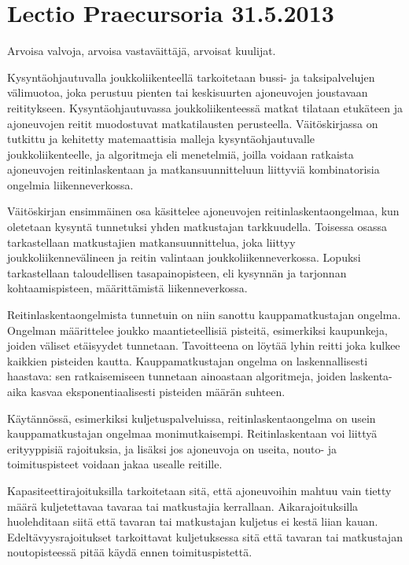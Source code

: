 \documentclass[a4paper,12pt]{article}
\begin{document}
\section*{Lectio Praecursoria 31.5.2013}
Arvoisa valvoja, arvoisa vastaväittäjä, arvoisat kuulijat.

Kysyntäohjautuvalla joukkoliikenteellä tarkoitetaan bussi- ja taksipalvelujen välimuotoa, joka perustuu pienten tai 
keskisuurten ajoneuvojen joustavaan reititykseen. Kysyntäohjautuvassa joukkoliikenteessä matkat tilataan etukäteen ja
ajoneuvojen reitit muodostuvat matkatilausten perusteella.
Väitöskirjassa on tutkittu ja kehitetty matemaattisia malleja kysyntäohjautuvalle joukkoliikenteelle, ja algoritmeja eli menetelmiä,
joilla voidaan ratkaista ajoneuvojen reitinlaskentaan ja matkansuunnitteluun liittyviä kombinatorisia ongelmia liikenneverkossa.

Väitöskirjan ensimmäinen osa käsittelee ajoneuvojen reitinlaskentaongelmaa, kun oletetaan kysyntä tunnetuksi yhden matkustajan tarkkuudella. 
Toisessa osassa tarkastellaan matkustajien matkansuunnittelua, joka liittyy joukkoliikennevälineen ja reitin valintaan joukkoliikenneverkossa.
Lopuksi tarkastellaan taloudellisen tasapainopisteen, eli kysynnän ja tarjonnan kohtaamispisteen, määrittämistä liikenneverkossa.

Reitinlaskentaongelmista tunnetuin on niin sanottu kauppamatkustajan ongelma. Ongelman määrittelee joukko maantieteellisiä 
pisteitä, esimerkiksi kaupunkeja, joiden väliset etäisyydet tunnetaan. Tavoitteena on löytää lyhin reitti joka kulkee kaikkien pisteiden kautta.
Kauppamatkustajan ongelma on laskennallisesti haastava: sen ratkaisemiseen tunnetaan ainoastaan algoritmeja, joiden laskenta-aika kasvaa 
eksponentiaalisesti pisteiden määrän suhteen.

Käytännössä, esimerkiksi kuljetuspalveluissa, reitinlaskentaongelma on usein kauppamatkustajan ongelmaa monimutkaisempi. 
Reitinlaskentaan voi liittyä erityyppisiä rajoituksia, ja lisäksi jos ajoneuvoja on useita, nouto- ja toimituspisteet voidaan 
jakaa usealle reitille.

Kapasiteettirajoituksilla tarkoitetaan sitä, että 
ajoneuvoihin mahtuu vain tietty määrä kuljetettavaa tavaraa tai matkustajia kerrallaan. Aikarajoituksilla huolehditaan siitä että
tavaran tai matkustajan kuljetus ei kestä liian kauan. Edeltävyysrajoitukset tarkoittavat kuljetuksessa sitä että tavaran
tai matkustajan noutopisteessä pitää käydä ennen toimituspistettä. 
\end{document}
